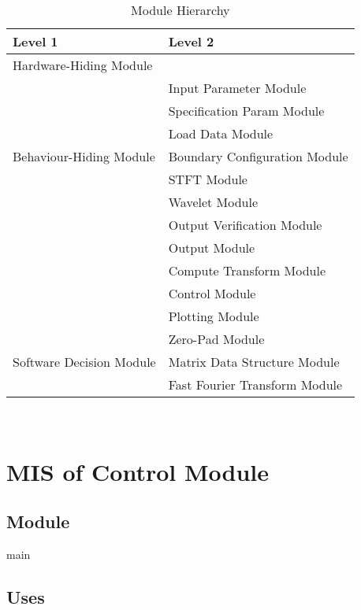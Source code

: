 \documentclass[12pt, titlepage]{article}
\begin{document}
\begin{table}[h!]
\centering
\begin{tabular}{p{} p{}}
\toprule
\textbf{Level 1} & \textbf{Level 2}\\
\midrule

{Hardware-Hiding Module} & ~ \\
\midrule

\multirow{7}{0.3\textwidth}{Behaviour-Hiding Module} &  Input Parameter Module\\
& Specification Param Module \\
& Load Data Module\\
& Boundary Configuration Module \\
& STFT Module\\
& Wavelet Module\\
& Output Verification Module\\
& Output Module\\
& Compute Transform Module \\ 
& Control Module\\
& Plotting Module\\
\midrule

\multirow{3}{0.3\textwidth}{Software Decision Module} & { Zero-Pad Module}\\
& Matrix Data Structure Module\\ 
& Fast Fourier Transform Module\\
\bottomrule

\end{tabular}
\caption{Module Hierarchy}
\label{TblMH}
\end{table}

\newpage
~\newpage

\section{MIS of Control Module} \label{ControlModule} 



\subsection{Module}

main

\subsection{Uses}
\end{document}
